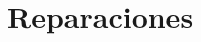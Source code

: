 \documentclass[../candidatura.tex]{subfiles}
\begin{document}
\esborrador

\section{Reparaciones}

\newpage
\end{document}
